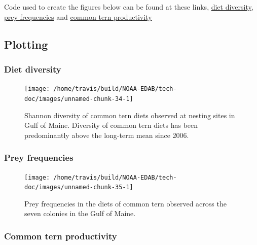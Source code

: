 \documentclass[
]{book}
\begin{document}
Code used to create the figures below can be found at these links, \href{https://github.com/NOAA-EDAB/ecodata/blob/master/chunk-scripts/macrofauna.Rmd-tern-diet-diversity.R}{diet diversity}, \href{https://github.com/NOAA-EDAB/ecodata/blob/master/chunk-scripts/macrofauna.Rmd-stacked-bar-prey-freq.R}{prey frequencies} and \href{https://github.com/NOAA-EDAB/ecodata/blob/master/chunk-scripts/macrofauna.Rmd-aggregate-prod.R}{common tern productivity}

\hypertarget{plotting-25}{%
\subsection{Plotting}\label{plotting-25}}

\hypertarget{diet-diversity}{%
\subsubsection{Diet diversity}\label{diet-diversity}}

\begin{figure}

{\centering \texttt{[image: /home/travis/build/NOAA-EDAB/tech-doc/images/unnamed-chunk-34-1]} 

}

\caption{Shannon diversity of common tern diets observed at nesting sites in Gulf of Maine. Diversity of common tern diets has been predominantly above the long-term mean since 2006.}\label{fig:unnamed-chunk-34}
\end{figure}

\hypertarget{prey-frequencies}{%
\subsubsection{Prey frequencies}\label{prey-frequencies}}



\begin{figure}

{\centering \texttt{[image: /home/travis/build/NOAA-EDAB/tech-doc/images/unnamed-chunk-35-1]} 

}

\caption{Prey frequencies in the diets of common tern observed across the seven colonies in the Gulf of Maine.}\label{fig:unnamed-chunk-35}
\end{figure}

\hypertarget{common-tern-productivity}{%
\subsubsection{Common tern productivity}\label{common-tern-productivity}}
\end{document}
